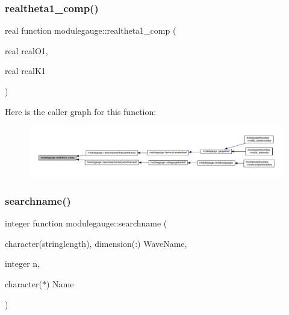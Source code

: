 \subsubsection{\texorpdfstring{realtheta1\+\_\+comp()}{realtheta1\_comp()}}
{\footnotesize\ttfamily real function modulegauge\+::realtheta1\+\_\+comp (\begin{DoxyParamCaption}\item[{real}]{real\+O1,  }\item[{real}]{real\+K1 }\end{DoxyParamCaption})\hspace{0.3cm}{\ttfamily [private]}}

Here is the caller graph for this function\+:\nopagebreak
\begin{figure}[H]
\begin{center}
\leavevmode
\includegraphics[width=350pt]{namespacemodulegauge_ad2e8899353e8c890c82e852038be05f9_icgraph}
\end{center}
\end{figure}
\mbox{\label{namespacemodulegauge_ab1a6acb6664eeba72c5a5d3487c6b4e6}} 
\subsubsection{\texorpdfstring{searchname()}{searchname()}}
{\footnotesize\ttfamily integer function modulegauge\+::searchname (\begin{DoxyParamCaption}\item[{character(stringlength), dimension(\+:)}]{Wave\+Name,  }\item[{integer}]{n,  }\item[{character($\ast$)}]{Name }\end{DoxyParamCaption})\hspace{0.3cm}{\ttfamily [private]}}

\mbox{\label{namespacemodulegauge_ae7a26f230136e4737c871ba19b1d1529}} 

